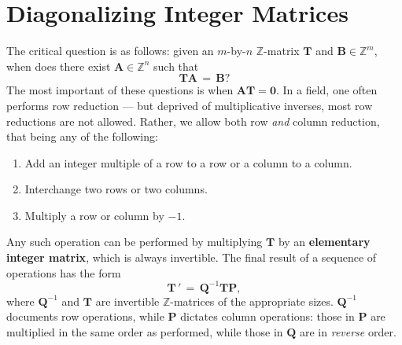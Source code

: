 \documentclass[11pt]{article}
\renewcommand{\vec}[1]{\mathbf{#1}}
\newcommand{\mat}[1]{\mathbf{#1}}
\begin{document}



%


\section{Diagonalizing Integer Matrices}

The critical question is as follows: given an $m$-by-$n$ $\mathbb{Z}$-matrix $\mat{T}$ and $\vec{B} \in \mathbb{Z}^{m}$, when does there exist $\vec{A} \in \mathbb{Z}^{n}$ such that
\[
  \mat{T}\vec{A} \, = \, \vec{B}?
\]
The most important of these questions is when $\vec{A} \mat{T} = \vec{0}$. In a field, one often performs row reduction --- but deprived of multiplicative inverses, most row reductions are not allowed. Rather, we allow both row \textit{and} column reduction, that being any of the following:
\begin{enumerate}
  \item Add an integer multiple of a row to a row or a column to a column.
  \item Interchange two rows or two columns.
  \item Multiply a row or column by $-1$.
\end{enumerate}

Any such operation can be performed by multiplying $\mat{T}$ by an \textbf{elementary integer matrix}, which is always invertible. The final result of a sequence of operations has the form
\[
  \mat{T} \, ' \, = \, \mat{Q}^{-1} \mat{T} \mat{P},
\]
where $\mat{Q}^{-1}$ and $\mat{T}$ are invertible $\mathbb{Z}$-matrices of the appropriate sizes. $\mat{Q}^{-1}$ documents row operations, while $\mat{P}$ dictates column operations: those in $\mat{P}$ are multiplied in the same order as performed, while those in $\mat{Q}$ are in \textit{reverse} order.
\end{document}
